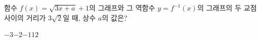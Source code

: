 \hspace*{2mm}\begin{minipage}[t]{\dimexpr\linewidth-2mm\relax}\vspace{0pt}
함수 $f(x)=\sqrt{3x+a}+1$의 그래프와 그 역함수 $y=f^{-1}(x)$의 그래프의 두 교점 사이의 거리가 $3\sqrt{2}$일 때, 상수 $a$의 값은?
\begin{choices32}{$-3$}{$-2$}{$-1$}{$1$}{$2$}\end{choices32}\end{minipage}
